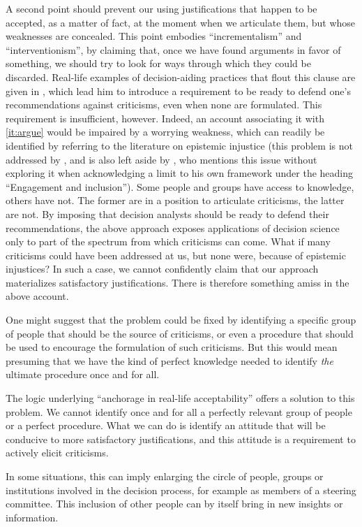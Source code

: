 \documentclass[preprint, french, english, 11pt, authoryear]{elsarticle}%
\begin{document}
A second point should prevent our using justifications that happen to be accepted, as a matter of fact, at the moment when we articulate them, but whose weaknesses are concealed. 
This point embodies “incrementalism” and ``interventionism'', by claiming that, once we have found arguments in favor of something, we should try to look for ways through which they could be discarded. 
Real-life examples of decision-aiding practices that flout this clause are given in \cite{meinard_what_2017}, which lead him to introduce a requirement to be ready to defend one's recommendations against criticisms, even when none are formulated. 
This requirement is insufficient, however. Indeed, an account associating it with \cref{it:argue} would be impaired by a worrying weakness, which can readily be identified by referring to the literature on epistemic injustice \citep{fricker_epistemic_2007} 
(this problem is not addressed by \cite{meinard_what_2017}, and is also left aside by \cite{mingers_ethics_2011}, who mentions this issue without exploring it when acknowledging a limit to his own framework under the heading ``Engagement and inclusion''). 
Some people and groups have access to knowledge, others have not. The former are in a position to articulate criticisms, the latter are not. 
By imposing that decision analysts should be ready to defend their recommendations, the above approach exposes applications of decision science only to part of the spectrum from which criticisms can come. 
What if many criticisms could have been addressed at us, but none were, because of epistemic injustices? In such a case, we cannot confidently claim that our approach materializes satisfactory justifications. There is therefore something amiss in the above account.

One might suggest that the problem could be fixed by identifying a specific group of people that should be the source of criticisms, or even a procedure that should be used to encourage the formulation of such criticisms. 
But this would mean presuming that we have the kind of perfect knowledge needed to identify \emph{the} ultimate procedure once and for all.

The logic underlying ``anchorage in real-life acceptability” offers a solution to this problem. We cannot identify once and for all a perfectly relevant group of people or a perfect procedure. 
What we can do is identify an attitude that will be conducive to more satisfactory justifications, and this attitude is a requirement to actively elicit criticisms.
\begin{changebar}
In some situations, this can imply enlarging the circle of people, groups or institutions involved in the decision process, for example as members of a steering committee.
This inclusion of other people can by itself bring in new insights or information.\end{changebar}
  
\end{document}
